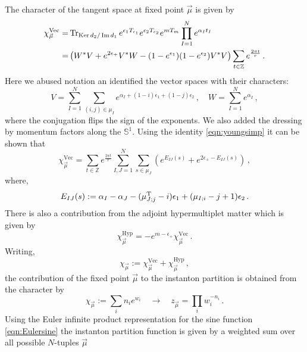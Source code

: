\documentclass[main.tex]{subfiles}
\begin{document}
The character of the tangent space at fixed point $\vec{\mu}$ is given by
\begin{equation}
\begin{aligned}
\chi_{\vec{\mu}}^{\text{Vec}}=&\operatorname{Tr}_{\operatorname{Ker} d_2/\operatorname{Im} d_1}e^{\epsilon_1T_{\epsilon_1}}e^{\epsilon_2T_{\epsilon_2}}e^{mT_{m}}\prod_{I=1}^Ne^{\alpha_It_I}\\
=&\left(W^*V+e^{2\epsilon_+}V^*W-(1-e^{\epsilon_1})(1-e^{\epsilon_2})V^*V\right)\sum_{t\in\mathbb{Z}}e^{\frac{2\pi t}{r}}\,.
\end{aligned}
\end{equation}
Here we abused notation an identified the vector spaces with their characters:
\begin{equation}
V=\sum_{I=1}^N\sum_{(i,j)\in\mu_I}e^{\alpha_I+(1-i)\epsilon_1+(1-j)\epsilon_2}\,,\quad W=\sum_{I=1}^Ne^{\alpha_I}\,,
\end{equation}
where the conjugation flips the sign of the exponents. We also added the dressing by momentum factors along the $\mathbb{S}^1$.  Using the identity \eqref{eqn:youngsimp} it can be shown that
\begin{equation}
\chi_{\vec{\mu}}^{\text{Vec}}=\sum_{t\in\mathbb{Z}}e^{\frac{2\pi t}{r}}\sum_{I,J=1}^N\sum_{s\in\mu_J}\left(e^{E_{IJ}(s)}+e^{2\epsilon_+-E_{IJ}(s)}\right)\,,
\end{equation}
where,
\begin{equation}
E_{IJ}(s):=\alpha_I-\alpha_J-(\mu^{\operatorname{T}}_{J;j}-i)\epsilon_1+(\mu_{I;i}-j+1)\epsilon_2\,.
\end{equation}
There is also a contribution from the adjoint hypermultiplet matter which is given by
\begin{equation}
\chi_{\vec{\mu}}^{\text{Hyp}}=-e^{m-\epsilon_+}\chi_{\vec{\mu}}^{\text{Vec}}\,.
\end{equation}
Writing,
\begin{equation}\label{eqn:ind}
\chi_{\vec{\mu}}:=\chi_{\vec{\mu}}^{\text{Vec}}+\chi_{\vec{\mu}}^{\text{Hyp}}\,,
\end{equation}
the contribution of the fixed point $\vec{\mu}$ to the instanton partition is obtained from the character by
\begin{equation}\label{eqn:chartopartitionfn}
\chi_{\vec{\mu}}:=\sum_{i}n_ie^{w_i}\quad \to \quad z_{\vec{\mu}}=\prod_{i}w_i^{-n_i}\,.
\end{equation}
Using the Euler infinite product representation for the sine function \eqref{eqn:Eulersine} the instanton partition function is given by a weighted sum over all possible $N$-tuples $\vec{\mu}$
\end{document}

